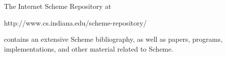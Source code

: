 
The Internet Scheme Repository at
\begin{center}
{\cf http://www.cs.indiana.edu/scheme-repository/}
\end{center}
contains an extensive Scheme bibliography, as well as papers,
programs, implementations, and other material related to Scheme.
